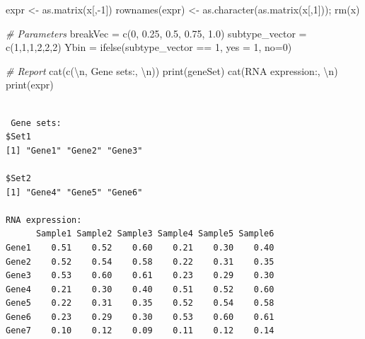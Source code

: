 \documentclass[
]{book}
\newenvironment{Shaded}{\begin{snugshade}}{\end{snugshade}}
\newcommand{\AttributeTok}[1]{\textcolor[rgb]{0.77,0.63,0.00}{#1}}
\newcommand{\CommentTok}[1]{\textcolor[rgb]{0.56,0.35,0.01}{\textit{#1}}}
\newcommand{\DecValTok}[1]{\textcolor[rgb]{0.00,0.00,0.81}{#1}}
\newcommand{\FloatTok}[1]{\textcolor[rgb]{0.00,0.00,0.81}{#1}}
\newcommand{\FunctionTok}[1]{\textcolor[rgb]{0.00,0.00,0.00}{#1}}
\newcommand{\NormalTok}[1]{#1}
\newcommand{\OtherTok}[1]{\textcolor[rgb]{0.56,0.35,0.01}{#1}}
\newcommand{\SpecialCharTok}[1]{\textcolor[rgb]{0.00,0.00,0.00}{#1}}
\newcommand{\StringTok}[1]{\textcolor[rgb]{0.31,0.60,0.02}{#1}}
\begin{document}
\begin{Shaded}
\begin{Highlighting}[]
\NormalTok{expr }\OtherTok{\textless{}{-}} \FunctionTok{as.matrix}\NormalTok{(x[,}\SpecialCharTok{{-}}\DecValTok{1}\NormalTok{])}
\FunctionTok{rownames}\NormalTok{(expr) }\OtherTok{\textless{}{-}} \FunctionTok{as.character}\NormalTok{(}\FunctionTok{as.matrix}\NormalTok{(x[,}\DecValTok{1}\NormalTok{])); }\FunctionTok{rm}\NormalTok{(x)}


\CommentTok{\# Parameters}
\NormalTok{breakVec }\OtherTok{=} \FunctionTok{c}\NormalTok{(}\DecValTok{0}\NormalTok{, }\FloatTok{0.25}\NormalTok{, }\FloatTok{0.5}\NormalTok{, }\FloatTok{0.75}\NormalTok{, }\FloatTok{1.0}\NormalTok{)}
\NormalTok{subtype\_vector }\OtherTok{=} \FunctionTok{c}\NormalTok{(}\DecValTok{1}\NormalTok{,}\DecValTok{1}\NormalTok{,}\DecValTok{1}\NormalTok{,}\DecValTok{2}\NormalTok{,}\DecValTok{2}\NormalTok{,}\DecValTok{2}\NormalTok{)}
\NormalTok{Ybin }\OtherTok{=} \FunctionTok{ifelse}\NormalTok{(subtype\_vector }\SpecialCharTok{==} \DecValTok{1}\NormalTok{, }\AttributeTok{yes =} \DecValTok{1}\NormalTok{, }\AttributeTok{no=}\DecValTok{0}\NormalTok{)}

\CommentTok{\# Report}
\FunctionTok{cat}\NormalTok{(}\FunctionTok{c}\NormalTok{(}\StringTok{\textquotesingle{}}\SpecialCharTok{\textbackslash{}n}\StringTok{\textquotesingle{}}\NormalTok{, }\StringTok{\textquotesingle{}Gene sets:\textquotesingle{}}\NormalTok{, }\StringTok{\textquotesingle{}}\SpecialCharTok{\textbackslash{}n}\StringTok{\textquotesingle{}}\NormalTok{))}
\FunctionTok{print}\NormalTok{(geneSet)}
\FunctionTok{cat}\NormalTok{(}\StringTok{\textquotesingle{}RNA expression:\textquotesingle{}}\NormalTok{, }\StringTok{\textquotesingle{}}\SpecialCharTok{\textbackslash{}n}\StringTok{\textquotesingle{}}\NormalTok{)}
\FunctionTok{print}\NormalTok{(expr)}
\end{Highlighting}
\end{Shaded}

\begin{verbatim}

 Gene sets: 
$Set1
[1] "Gene1" "Gene2" "Gene3"

$Set2
[1] "Gene4" "Gene5" "Gene6"

RNA expression: 
      Sample1 Sample2 Sample3 Sample4 Sample5 Sample6
Gene1    0.51    0.52    0.60    0.21    0.30    0.40
Gene2    0.52    0.54    0.58    0.22    0.31    0.35
Gene3    0.53    0.60    0.61    0.23    0.29    0.30
Gene4    0.21    0.30    0.40    0.51    0.52    0.60
Gene5    0.22    0.31    0.35    0.52    0.54    0.58
Gene6    0.23    0.29    0.30    0.53    0.60    0.61
Gene7    0.10    0.12    0.09    0.11    0.12    0.14
\end{verbatim}
\end{document}
